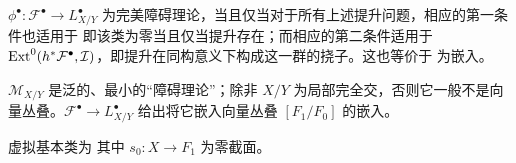 \begin{proposition}\label{pro:3.9}
$\phi^\bullet:\mathcal F^\bullet\to L_{X/Y}^\bullet$ 为完美障碍理论，当且仅当对于所有上述提升问题，相应的第一条件也适用于
即该类为零当且仅当提升存在；而相应的第二条件适用于 $\operatorname{Ext}^0(h^*\mathcal F^\bullet,\mathcal I)$，即提升在同构意义下构成这一群的挠子。这也等价于
为嵌入。
\end{proposition}
\begin{theorem}\label{thm:3.10}
$\mathcal M_{X/Y}$ 是泛的、最小的“障碍理论”；除非 $X/Y$ 为局部完全交，否则它一般不是向量丛叠。$\mathcal F^\bullet\to L_{X/Y}^\bullet$ 给出将它嵌入向量丛叠 $[F_1/F_0]$ 的嵌入。
\end{theorem}
虚拟基本类为
其中 $s_0:X\to F_1$ 为零截面。
